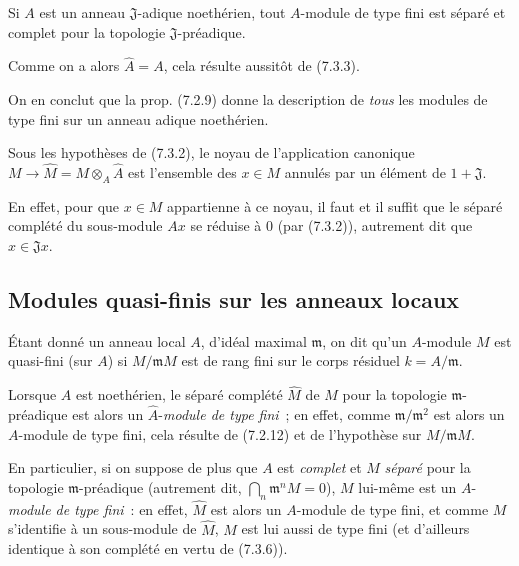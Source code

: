 \begin{corollary}[7.3.6]
\label{0.7.3.6-fr}
Si $A$ est un anneau $\mathfrak J$-adique noethérien, tout $A$-module de type
fini est séparé et complet pour la topologie $\mathfrak J$-préadique.
\end{corollary}

Comme on a alors $\widehat A=A$, cela résulte aussitôt de (7.3.3).

On en conclut que la prop. (7.2.9) donne la description de \emph{tous} les
modules de type fini sur un anneau adique noethérien.

\begin{corollary}[7.3.7]
\label{0.7.3.7-fr}
Sous les hypothèses de (7.3.2), le noyau de l'application canonique
$M\to\widehat M=M\otimes_A\widehat A$ est l'ensemble des $x\in M$ annulés par
un élément de $1+\mathfrak J$.
\end{corollary}

En effet, pour que $x\in M$ appartienne à ce noyau, il faut et il suffit que
le séparé complété du sous-module $Ax$ se réduise à 0 (par (7.3.2)), autrement
dit que $x\in\mathfrak Jx$.

\subsection{Modules quasi-finis sur les anneaux locaux}
\label{subsection:0.7.4-fr}

\begin{definition}[7.4.1]
\label{0.7.4.1-fr}
Étant donné un anneau local $A$, d'idéal maximal $\mathfrak m$, on dit qu'un
$A$-module $M$ est quasi-fini (sur $A$) si $M/\mathfrak mM$ est de rang fini
sur le corps résiduel $k=A/\mathfrak m$.
\end{definition}

Lorsque $A$ est noethérien, le séparé complété $\widehat M$ de $M$ pour la
topologie $\mathfrak m$-préadique est alors un
$\widehat A$-\emph{module de type fini}~; en effet, comme
$\mathfrak m/\mathfrak m^2$ est alors un $A$-module de type fini, cela résulte
de (7.2.12) et de l'hypothèse sur $M/\mathfrak mM$.

En particulier, si on suppose de plus que $A$ est \emph{complet} et $M$
\emph{séparé} pour la topologie $\mathfrak m$-préadique (autrement dit,
$\bigcap_n\mathfrak m^nM=0$), $M$ lui-même est un
$A$-\emph{module de type fini}~: en effet, $\widehat M$ est alors un
$A$-module de type fini, et comme $M$ s'identifie à un sous-module de
$\widehat M$, $M$ est lui aussi de type fini (et d'ailleurs identique à son
complété en vertu de (7.3.6)).

